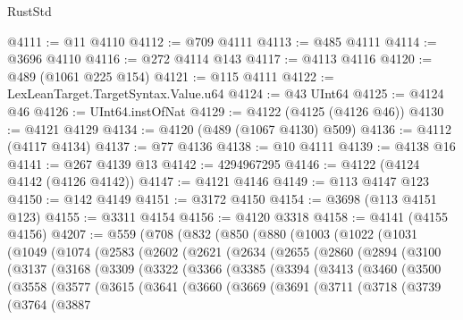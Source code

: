 \begin{lexlean}{RustStd}
\begin{coremodule}
@4111 := @11 @4110
@4112 := @709 @4111
@4113 := @485 @4111
@4114 := @3696 @4110
@4116 := @272 @4114 @143
@4117 := @4113 @4116
@4120 := @489 (@1061 @225 @154)
@4121 := @115 @4111
@4122 := LexLeanTarget.TargetSyntax.Value.u64
@4124 := @43 UInt64
@4125 := @4124 @46
@4126 := UInt64.instOfNat
@4129 := @4122 (@4125 (@4126 @46))
@4130 := @4121 @4129
@4134 := @4120 (@489 (@1067 @4130) @509)
@4136 := @4112 (@4117 @4134)
@4137 := @77 @4136
@4138 := @10 @4111
@4139 := @4138 @16
@4141 := @267 @4139 @13
@4142 := 4294967295
@4146 := @4122 (@4124 @4142 (@4126 @4142))
@4147 := @4121 @4146
@4149 := @113 @4147 @123
@4150 := @142 @4149
@4151 := @3172 @4150
@4154 := @3698 (@113 @4151 @123)
@4155 := @3311 @4154
@4156 := @4120 @3318
@4158 := @4141 (@4155 @4156)
@4207 := @559
    (@708
      (@832
        (@850
          (@880
            (@1003
              (@1022
                (@1031
                  (@1049
                    (@1074
                      (@2583
                        (@2602
                          (@2621
                            (@2634
                              (@2655
                                (@2860
                                  (@2894
                                    (@3100
                                      (@3137
                                        (@3168
                                          (@3309
                                            (@3322
                                              (@3366
                                                (@3385
                                                  (@3394
                                                    (@3413
                                                      (@3460
                                                        (@3500
                                                          (@3558
                                                            (@3577
                                                              (@3615
                                                                (@3641
                                                                  (@3660
                                                                    (@3669
                                                                      (@3691
                                                                        (@3711
                                                                          (@3718
                                                                            (@3739
                                                                              (@3764
                                                                                (@3887

\end{coremodule}
\end{lexlean}
